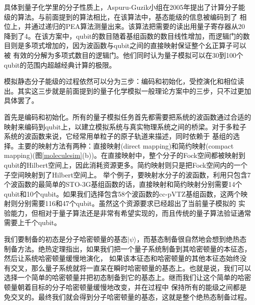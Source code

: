 具体到量子化学里的分子性质上，Aspuru-Guzik小组在2005年提出了计算分子能级的算法\cite{Alan_first}。与前面提到的算法相比，在该算法中，基态能级的信息被编码到了
相位上，并通过递归的PEA算法测量出来。该算法把需要的读出用量子寄存器从20降到了4。在该方案中，qubit的数目随着基组函数的数目线性增加，而逻辑门的数目则是多项式增加的，因为波函数与qubit之间的直接映射保证整个幺正算子可以被
有效的分解为多项式数目的逻辑门。他们同时认为量子模拟可以在30到100个qubit的范围内超越经典计算的极限。

模拟静态分子能级的过程依然可以分为三步：编码和初始化，受控演化和相位读出。其实这三步就是前面提到的量子化学模拟一般理论方案中的三步，只不过更加具体罢了。

首先是编码和初始化。所有的量子模拟任务首先都需要把系统的波函数通过合适的映射来编码到qubit上，以建立模拟系统与真实物理系统之间的桥梁。对于多粒子系统的波函数来说，它经常用单粒子的原子轨道来描述，同时依赖于
基组的选择。主要的映射方法有两种：直接映射(direct mapping)和简约映射(compact mapping)(图\ref{moleculesim}(b))。在直接映射中，整个分子的Fock空间都被映射到qubit的Hilbert空间上，因此消耗资源更多。简约映射则只是把Fock空间内的一个子空间映射到了Hilbert空间上。
举个例子，要映射水分子的波函数，利用只包含7个波函数的最简单的STO-3G基组函数的话，直接映射和简约映射分别需要14个qubit和10个qubit。如果我们选择包含58个波函数的cc-pVTZ基组函数，这两个映射则分别需要116和47个qubit。虽然这个资源要求已经超出了当前量子模拟的
实验能力，但相对于量子算法还是非常有希望实现的，而且传统的量子算法验证通常需要上千个qubit。

我们要制备的初态是分子哈密顿量的基态$|\psi\rangle$，而基态制备很自然地会想到绝热态制备方法。绝热定理\cite{qschem28,qschem29}指出，如果我们把一个量子系统制备到其哈密顿量的本征态，然后让系统哈密顿量缓慢地演化，
如果该本征态和哈密顿量的其他本征态始终没有交叉，那么量子系统就将一直呆在瞬时哈密顿量的基态上。也就是说，我们可以选择一个简单的哈密顿量并把初态制备到它的基态上。继而我们让这个简单的哈密顿量朝着目标的分子哈密顿量缓慢地改变，并在过程中
保持所有的能级之间都是免交叉的。最终我们就会得到分子哈密顿量的基态，这就是整个绝热态制备过程。

